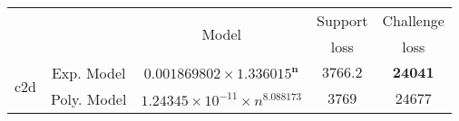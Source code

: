 \begin{tabular}{ccccc} 
\hline 
 &  & \multirow{2}{*}{Model} & Support & Challenge\tabularnewline 
 &  &  & loss  & loss\tabularnewline 
\hline 
\hline 
\multirow{2}{*}{c2d} & Exp. Model & $\mathbf{0.001869802\times 1.336015^{n}}$ & $\mathbf{3766.2}$ & $\mathbf{24041}$ \tabularnewline 
 & Poly. Model & $1.24345\times10^{-11}\times n^{8.088173}$ & $3769$ & $24677$ \tabularnewline 
\hline 
\end{tabular} 

